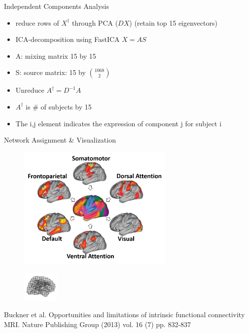 \documentclass[presentation]{beamer}
\begin{document}
\begin{frame}[label={sec:orgheadline16}]{Independent Components Analysis}
\begin{itemize}
\item reduce rows of \(X^{\dagger}\) through PCA (\(DX\)) (retain top 15 eigenvectors)
\item ICA-decomposition using FastICA \(X=AS\)
\item A: mixing matrix 15 by 15
\item S: source matrix: 15 by \({1068}\choose{2}\)
\item Unreduce \(A^{\dagger}=D^{-1}A\)
\item \(A^{\dagger}\) is \# of subjects by 15
\item The i,j element indicates the expression of component j for subject i
\end{itemize}
\end{frame}
\begin{frame}[label={sec:orgheadline17}]{Network Assignment \& Visualization}
\begin{figure}[htb]
\centering
\includegraphics[height=6cm]{./Figures/Yeo1.png}
\end{figure}
\begin{figure}[htb]
\centering
\includegraphics[height=1.5cm]{./Figures/Yeo2.png}
\end{figure}

Buckner et al. Opportunities and limitations of intrinsic functional connectivity MRI. Nature Publishing Group (2013) vol. 16 (7) pp. 832-837
\end{frame}
\end{document}

